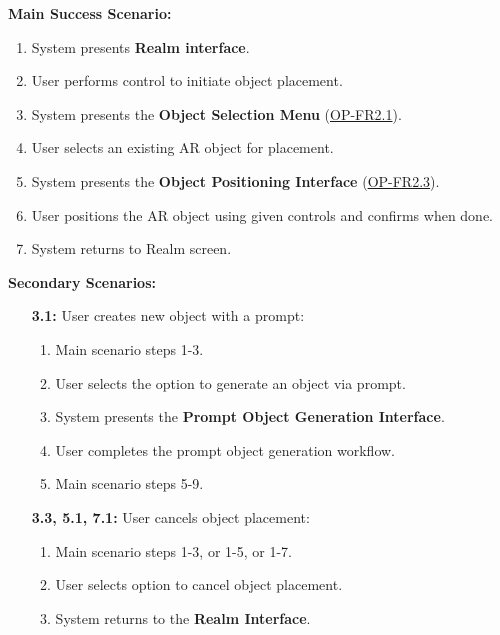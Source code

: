 \documentclass{article}
\begin{document}
\begin{enumerate}[label=\textbf{UC\arabic*}]
          \textbf{Main Success Scenario:}
          \begin{enumerate}[label=\textbf{\arabic*.}]
              \item System presents \textbf{Realm interface}.
              \item User performs control to initiate object placement.
              \item System presents the \textbf{Object Selection Menu} (\hyperref[ssub:object_placement]{OP-FR2.1}).
              \item User selects an existing AR object for placement.
              \item System presents the \textbf{Object Positioning Interface} (\hyperref[ssub:object_placement]{OP-FR2.3}).
              \item User positions the AR object using given controls and confirms when done.
              \item System returns to Realm screen.
          \end{enumerate}

          \textbf{Secondary Scenarios:}
          \begin{itemize}
              \item[{\bf 3.1:}] User creates new object with a prompt:
                    \begin{enumerate}[label=\textbf{\arabic*.}]
                        \item Main scenario steps 1-3.
                        \item User selects the option to generate an object via prompt.
                        \item System presents the \textbf{Prompt Object Generation Interface}.
                        \item User completes the prompt object generation workflow.
                        \item Main scenario steps 5-9.
                    \end{enumerate}

              \item[{\bf 3.3, 5.1, 7.1:}] User cancels object placement:
                    \begin{enumerate}[label=\textbf{\arabic*.}]
                        \item Main scenario steps 1-3, or 1-5, or 1-7.
                        \item User selects option to cancel object placement.
                        \item System returns to the \textbf{Realm Interface}.
                    \end{enumerate}


\end{itemize}
\end{enumerate}
\end{document}
